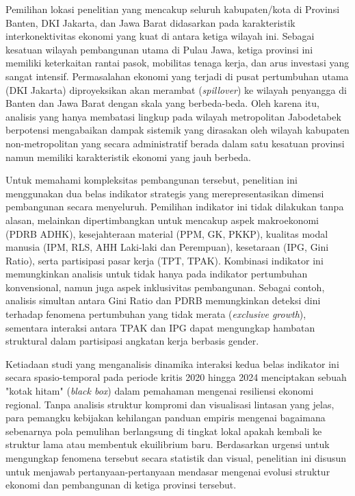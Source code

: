 Pemilihan lokasi penelitian yang mencakup seluruh kabupaten/kota di Provinsi Banten, DKI Jakarta, dan Jawa Barat didasarkan pada karakteristik interkonektivitas ekonomi yang kuat di antara ketiga wilayah ini. Sebagai kesatuan wilayah pembangunan utama di Pulau Jawa, ketiga provinsi ini memiliki keterkaitan rantai pasok, mobilitas tenaga kerja, dan arus investasi yang sangat intensif. Permasalahan ekonomi yang terjadi di pusat pertumbuhan utama (DKI Jakarta) diproyeksikan akan merambat (\textit{spillover}) ke wilayah penyangga di Banten dan Jawa Barat dengan skala yang berbeda-beda. Oleh karena itu, analisis yang hanya membatasi lingkup pada wilayah metropolitan Jabodetabek berpotensi mengabaikan dampak sistemik yang dirasakan oleh wilayah kabupaten non-metropolitan yang secara administratif berada dalam satu kesatuan provinsi namun memiliki karakteristik ekonomi yang jauh berbeda.

Untuk memahami kompleksitas pembangunan tersebut, penelitian ini menggunakan dua belas indikator strategis yang merepresentasikan dimensi pembangunan secara menyeluruh. Pemilihan indikator ini tidak dilakukan tanpa alasan, melainkan dipertimbangkan untuk mencakup aspek makroekonomi (PDRB ADHK), kesejahteraan material (PPM, GK, PKKP), kualitas modal manusia (IPM, RLS, AHH Laki-laki dan Perempuan), kesetaraan (IPG, Gini Ratio), serta partisipasi pasar kerja (TPT, TPAK). Kombinasi indikator ini memungkinkan analisis untuk tidak hanya pada indikator pertumbuhan konvensional, namun juga aspek inklusivitas pembangunan. Sebagai contoh, analisis simultan antara Gini Ratio dan PDRB memungkinkan deteksi dini terhadap fenomena pertumbuhan yang tidak merata (\textit{exclusive growth}), sementara interaksi antara TPAK dan IPG dapat mengungkap hambatan struktural dalam partisipasi angkatan kerja berbasis gender.

Ketiadaan studi yang menganalisis dinamika interaksi kedua belas indikator ini secara spasio-temporal pada periode kritis 2020 hingga 2024 menciptakan sebuah "kotak hitam" (\textit{black box}) dalam pemahaman mengenai resiliensi ekonomi regional. Tanpa analisis struktur kompromi dan visualisasi lintasan yang jelas, para pemangku kebijakan kehilangan panduan empiris mengenai bagaimana sebenarnya pola pemulihan berlangsung di tingkat lokal apakah kembali ke struktur lama atau membentuk ekuilibrium baru. Berdasarkan urgensi untuk mengungkap fenomena tersebut secara statistik dan visual, penelitian ini disusun untuk menjawab pertanyaan-pertanyaan mendasar mengenai evolusi struktur ekonomi dan pembangunan di ketiga provinsi tersebut.

